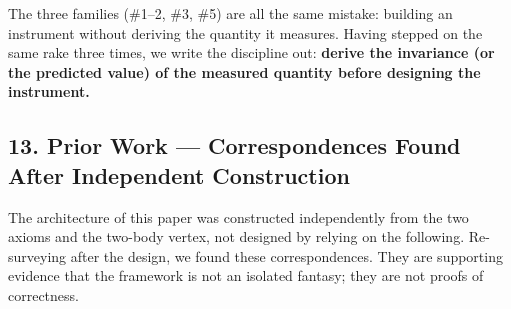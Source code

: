 \documentclass[
  a4paper,
]{article}
\begin{document}
The three families (\#1--2, \#3, \#5) are all the same mistake: building
an instrument without deriving the quantity it measures. Having stepped
on the same rake three times, we write the discipline out:
\textbf{derive the invariance (or the predicted value) of the measured
quantity before designing the instrument.}

\subsection{13. Prior Work --- Correspondences Found After Independent
Construction}\label{prior-work-correspondences-found-after-independent-construction}

The architecture of this paper was constructed independently from the
two axioms and the two-body vertex, not designed by relying on the
following. Re-surveying after the design, we found these
correspondences. They are supporting evidence that the framework is not
an isolated fantasy; they are not proofs of correctness.
\end{document}
